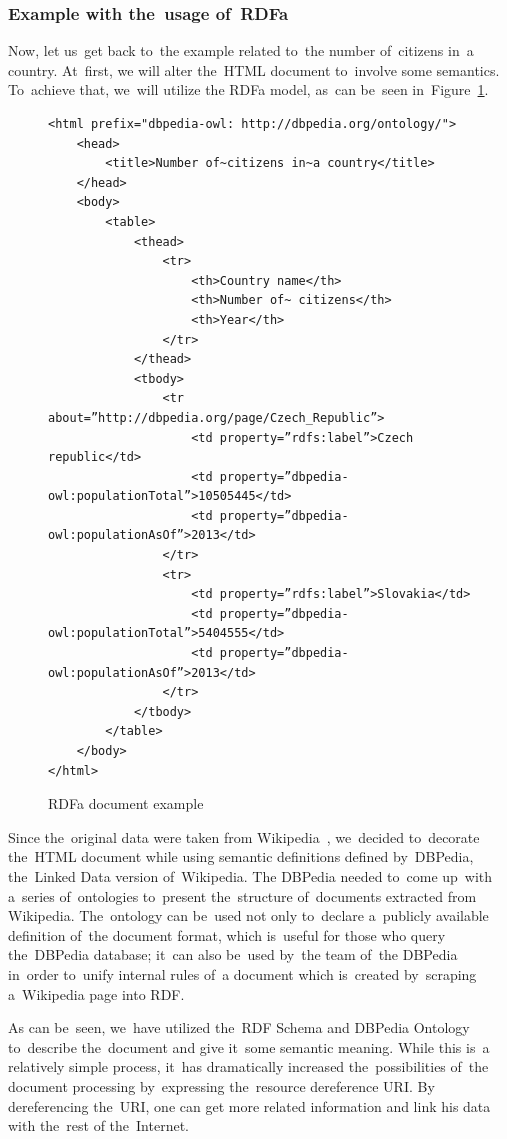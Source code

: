 \subsubsection{Example with the~usage of~RDFa}

Now, let us~get back to~the example related to~the number of~citizens in~a country. At~first, we
will alter the~HTML document to~involve some semantics. To~achieve that, we~will utilize the
RDFa model, as~can be~seen in~Figure~\ref{fig:example-rdfa}.

\begin{figure}
\scriptsize\begin{verbatim}
<html prefix="dbpedia-owl: http://dbpedia.org/ontology/">
    <head>
        <title>Number of~citizens in~a country</title>
    </head>
    <body>
        <table>
            <thead>
                <tr>
                    <th>Country name</th>
                    <th>Number of~ citizens</th>
                    <th>Year</th>
                </tr>
            </thead>
            <tbody>
                <tr about=”http://dbpedia.org/page/Czech_Republic”>
                    <td property=”rdfs:label”>Czech republic</td>
                    <td property=”dbpedia-owl:populationTotal”>10505445</td>
                    <td property=”dbpedia-owl:populationAsOf”>2013</td>
                </tr>
                <tr>
                    <td property=”rdfs:label”>Slovakia</td>
                    <td property=”dbpedia-owl:populationTotal”>5404555</td>
                    <td property=”dbpedia-owl:populationAsOf”>2013</td>
                </tr>
            </tbody>
        </table>
    </body>
</html>
\end{verbatim}\normalsize
\caption{RDFa document example}
\label{fig:example-rdfa}
\end{figure}

Since the~original data were taken from Wikipedia~\cite{wikipedia}, we~decided to~decorate the~HTML document
while using semantic definitions defined by~DBPedia, the~Linked Data version of~Wikipedia. 
The DBPedia needed to~come up~with a~series of~ontologies to~present the~structure of~documents
extracted from Wikipedia. The~ontology can be~used not only to~declare a~publicly available definition of~the document format, which is~useful for those who query the~DBPedia database; it~can also be~used by~the team of~the DBPedia in~order to~unify internal rules of~a document which is~created by~scraping a~Wikipedia page into RDF.

As can be~seen, we~have utilized the~RDF Schema and DBPedia Ontology to~describe the~document
and give it~some semantic meaning. While this is~a relatively simple process, it~has dramatically
increased the~possibilities of~the document processing by~expressing the~resource dereference URI.
By dereferencing the~URI, one can get more related information and link his data with the~rest
of the~Internet.

